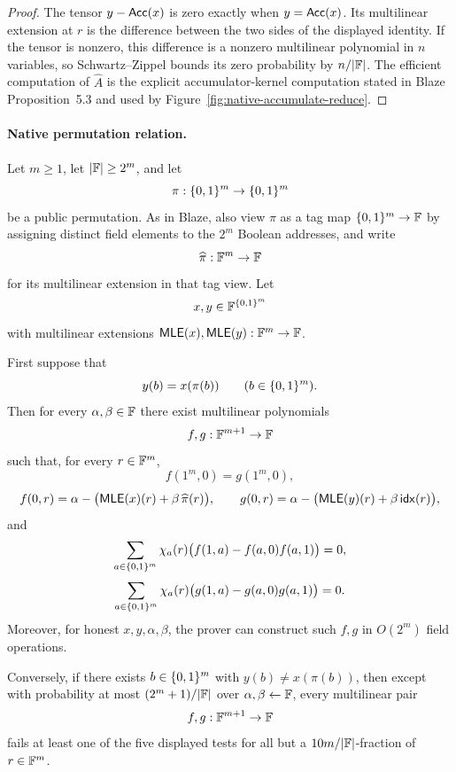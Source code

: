 \begin{proof}
The tensor \(y-\mathsf{Acc}(x)\) is zero exactly when \(y=\mathsf{Acc}(x)\).  Its multilinear
extension at \(r\) is the difference between the two sides of the displayed
identity.  If the tensor is nonzero, this difference is a nonzero multilinear
polynomial in \(n\) variables, so Schwartz--Zippel bounds its zero probability
by \(n/|\mathbb{F}|\).  The efficient computation of \(\widehat A\) is the explicit
accumulator-kernel computation stated in Blaze Proposition~5.3 and used by
Figure~\ref{fig:native-accumulate-reduce}.
\end{proof}

\paragraph{Native permutation relation.}

\begin{proposition}
\label{prop:blaze-permutation-replay}
Let \(m\ge 1\), let \(|\mathbb{F}|\ge 2^m\), and let
\[
  \pi:\{0,1\}^m\to\{0,1\}^m
\]
be a public permutation.  As in Blaze, also view \(\pi\) as a tag map
\(\{0,1\}^m\to\mathbb{F}\) by assigning distinct field elements to the \(2^m\) Boolean
addresses, and write
\[
  \widehat\pi:\mathbb{F}^m\to\mathbb{F}
\]
for its multilinear extension in that tag view.  Let
\[
  x,y\in\mathbb{F}^{\{0,1\}^m}
\]
with multilinear extensions \(\mathsf{MLE}(x),\mathsf{MLE}(y):\mathbb{F}^m\to\mathbb{F}\).

First suppose that
\[
  y(b)=x(\pi(b))\qquad(b\in\{0,1\}^m).
\]
Then for every \(\alpha,\beta\in\mathbb{F}\) there exist multilinear polynomials
\[
  f,g:\mathbb{F}^{m+1}\to\mathbb{F}
\]
such that, for every \(r\in\mathbb{F}^m\),
\[
  f(1^m,0)=g(1^m,0),
\]
\[
  f(0,r)=\alpha-\bigl(\mathsf{MLE}(x)(r)+\beta\,\widehat\pi(r)\bigr),
  \qquad
  g(0,r)=\alpha-\bigl(\mathsf{MLE}(y)(r)+\beta\,\mathsf{idx}(r)\bigr),
\]
and
\[
  \sum_{a\in\{0,1\}^m}\chi_a(r)
  \bigl(f(1,a)-f(a,0)f(a,1)\bigr)=0,
\]
\[
  \sum_{a\in\{0,1\}^m}\chi_a(r)
  \bigl(g(1,a)-g(a,0)g(a,1)\bigr)=0.
\]
Moreover, for honest \(x,y,\alpha,\beta\), the prover can construct such
\(f,g\) in \(O(2^m)\) field operations.

Conversely, if there exists \(b\in\{0,1\}^m\) with \(y(b)\ne x(\pi(b))\), then
except with probability at most \((2^m+1)/|\mathbb{F}|\) over
\(\alpha,\beta\leftarrow\mathbb{F}\), every multilinear pair
\[
  f,g:\mathbb{F}^{m+1}\to\mathbb{F}
\]
fails at least one of the five displayed tests for all but a
\(10m/|\mathbb{F}|\)-fraction of \(r\in\mathbb{F}^m\).
\end{proposition}

